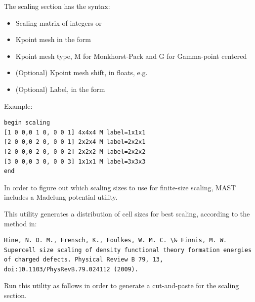 \documentclass[letterpaper,10pt,english]{sphinxmanual}
\begin{document}
The scaling section has the syntax:
\begin{itemize}
\item {} 
Scaling matrix of integers \code{{[}M, N, P{]}} or \code{{[}M1 M2 M3, N1 N2 N3, P1 P2 P3{]}}

\item {} 
Kpoint mesh in the form 

\item {} 
Kpoint mesh type, M for Monkhorst-Pack and G for Gamma-point centered

\item {} 
(Optional) Kpoint mesh shift, in floats, e.g. 

\item {} 
(Optional) Label, in the form 

\end{itemize}

Example:

\begin{Verbatim}[commandchars=\\\{\}]
begin scaling
[1 0 0,0 1 0, 0 0 1] 4x4x4 M label=1x1x1
[2 0 0,0 2 0, 0 0 1] 2x2x4 M label=2x2x1
[2 0 0,0 2 0, 0 0 2] 2x2x2 M label=2x2x2
[3 0 0,0 3 0, 0 0 3] 1x1x1 M label=3x3x3
end
\end{Verbatim}

In order to figure out which scaling sizes to use for finite-size scaling, MAST includes a Madelung potential utility.

This utility generates a distribution of cell sizes for best scaling, according to the method in:

\begin{Verbatim}[commandchars=\\\{\}]
Hine, N. D. M., Frensch, K., Foulkes, W. M. C. \& Finnis, M. W. Supercell size scaling of density functional theory formation energies of charged defects. Physical Review B 79, 13, doi:10.1103/PhysRevB.79.024112 (2009).
\end{Verbatim}

Run this utility as follows in order to generate a cut-and-paste for the scaling section.
\end{document}
